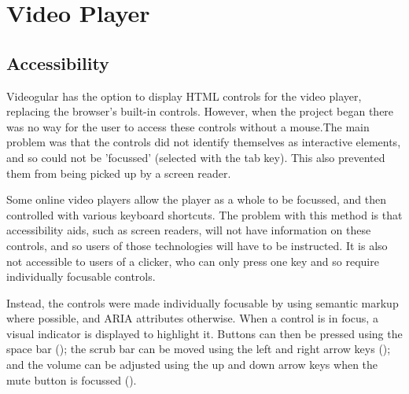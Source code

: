 \chapter{Video Player} 
\label{Chapter:Video Player}

\section{Accessibility} 
\label{Section:Accessibility}
Videogular has the option to display HTML controls for the video player, replacing the browser's built-in controls. However, when the project began there was no way for the user to access these controls without a mouse.The main problem was that the controls did not identify themselves as interactive elements, and so could not be 'focussed' (selected with the tab key). This also prevented them from being picked up by a screen reader.

Some online video players allow the player as a whole to be focussed, and then controlled with various keyboard shortcuts. The problem with this method is that accessibility aids, such as screen readers, will not have information on these controls, and so users of those technologies will have to be instructed. It is also not accessible to users of a clicker, who can only press one key and so require individually focusable controls.

Instead, the controls were made individually focusable by using semantic markup where possible, and ARIA attributes otherwise. When a control is in focus, a visual indicator is displayed to highlight it. Buttons can then be pressed using the space bar (); the scrub bar can be moved using the left and right arrow keys (); and the volume can be adjusted using the up and down arrow keys when the mute button is focussed ().

